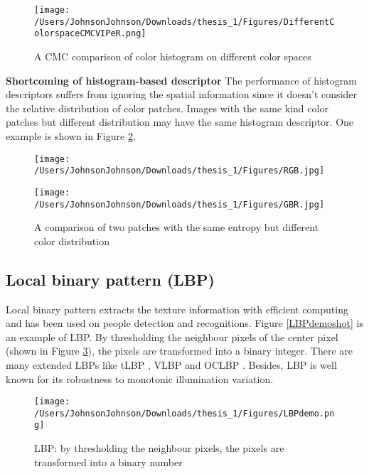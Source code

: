 \begin{figure}
\centering
\texttt{[image: /Users/JohnsonJohnson/Downloads/thesis\_1/Figures/DifferentColorspaceCMCVIPeR.png]}
\caption{A CMC comparison of color histogram on different color spaces}
\label{CMCcolorspaces}
\vspace{0em}
\end{figure} 


\textbf{Shortcoming of histogram-based descriptor} The performance of histogram descriptors suffers from ignoring the spatial information since it doesn't consider the relative distribution of color patches. Images with the same kind color patches but different distribution may have the same histogram descriptor. One example is shown in Figure \ref{RGBbgr}.

\begin{figure}[H]
\begin{minipage}[t]{0.5\linewidth}
\centering
\texttt{[image: /Users/JohnsonJohnson/Downloads/thesis\_1/Figures/RGB.jpg]}
\end{minipage}%
\begin{minipage}[t]{0.5\linewidth}
\centering
\texttt{[image: /Users/JohnsonJohnson/Downloads/thesis\_1/Figures/GBR.jpg]}
\end{minipage}
\caption{A comparison of two patches with the same entropy but different color distribution}
\label{RGBbgr}
\end{figure}


\subsection{Local binary pattern (LBP)}
Local binary pattern \cite{LBP1, LBP2} extracts the texture information with efficient computing and has been used on people detection and recognitions. Figure \ref{LBPdemoshot} is an example of LBP. By thresholding the neighbour pixels of the center pixel (shown in Figure \ref{LBPtheory}), the pixels are transformed into a binary integer. There are many extended LBPs like tLBP \cite{tLBP}, VLBP \cite{VLBP} and OCLBP \cite{OCLBP}. Besides, LBP is well known for its robustness to monotonic illumination variation.
\begin{figure}[H]
\centering
\texttt{[image: /Users/JohnsonJohnson/Downloads/thesis\_1/Figures/LBPdemo.png]}
\caption{LBP: by thresholding the neighbour pixels, the pixels are transformed into a binary number }
\label{LBPtheory}
\vspace{0em}
\end{figure}



